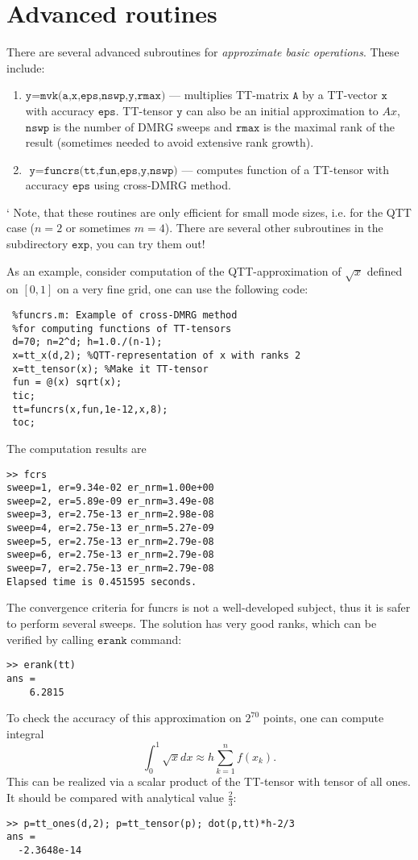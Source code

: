 \documentclass[a4paper,12pt,twoside]{article}
\begin{document}
\section{Advanced routines}
There are several advanced subroutines for \emph{approximate basic operations}. These include:
\begin{enumerate}
\item $\texttt{y=mvk(a,x,eps,nswp,y,rmax)}$ --- multiplies TT-matrix $\texttt{A}$ by a TT-vector $\texttt{x}$ 
with accuracy $\texttt{eps}$. TT-tensor $\texttt{y}$ can also be an initial approximation to $Ax$, $\texttt{nswp}$ 
is the number of DMRG sweeps and $\texttt{rmax}$ is the maximal rank of the result (sometimes needed to avoid
extensive rank growth).
\item $\texttt{ y=funcrs(tt,fun,eps,y,nswp)}$ --- computes function of a TT-tensor with accuracy $\texttt{eps}$
using cross-DMRG method.
\end{enumerate}`
Note, that these routines are only efficient for small mode sizes, i.e. for the QTT case ($n=2$ or 
sometimes $m=4$). There are several other subroutines in the subdirectory $\texttt{exp}$, you can try them out!

As an example, consider computation of the QTT-approximation of $\sqrt{x}$ defined on $[0,1]$ on a very fine grid, one can use the 
following code:
\begin{lstlisting}
 %funcrs.m: Example of cross-DMRG method 
 %for computing functions of TT-tensors
 d=70; n=2^d; h=1.0./(n-1); 
 x=tt_x(d,2); %QTT-representation of x with ranks 2
 x=tt_tensor(x); %Make it TT-tensor
 fun = @(x) sqrt(x);
 tic;
 tt=funcrs(x,fun,1e-12,x,8);
 toc;
\end{lstlisting}

The computation results are
\begin{lstlisting}
>> fcrs
sweep=1, er=9.34e-02 er_nrm=1.00e+00 
sweep=2, er=5.89e-09 er_nrm=3.49e-08 
sweep=3, er=2.75e-13 er_nrm=2.98e-08 
sweep=4, er=2.75e-13 er_nrm=5.27e-09 
sweep=5, er=2.75e-13 er_nrm=2.79e-08 
sweep=6, er=2.75e-13 er_nrm=2.79e-08 
sweep=7, er=2.75e-13 er_nrm=2.79e-08 
Elapsed time is 0.451595 seconds.
\end{lstlisting}
The convergence criteria for funcrs is not a well-developed subject, thus it is safer to perform 
several sweeps.
The solution has very good ranks, which can be verified by calling $\texttt{erank}$ command:
\begin{lstlisting}
>> erank(tt)
ans =
    6.2815
\end{lstlisting}
To check the accuracy of this approximation on $2^{70}$ points, one can compute integral
$$\int_{0}^1 \sqrt{x} dx \approx h \sum_{k=1}^n f(x_k).$$
This can be realized via a scalar product of the TT-tensor with tensor of all ones.
It should be compared with analytical value $\frac{2}{3}$:
\begin{lstlisting}
>> p=tt_ones(d,2); p=tt_tensor(p); dot(p,tt)*h-2/3
ans =
  -2.3648e-14
\end{lstlisting}

%
\end{document}
